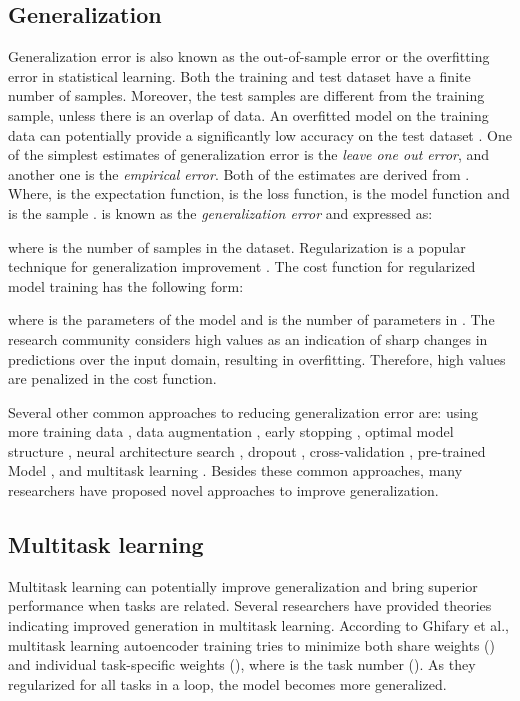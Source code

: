 \documentclass{article}
\begin{document}
\subsection{Generalization}
Generalization error is also known as the out-of-sample error or the overfitting error in statistical learning. Both the training and test dataset have a finite number of samples. Moreover, the test samples are different from the training sample, unless there is an overlap of data. An overfitted model on the training data can potentially provide a significantly low accuracy on the test dataset \cite{bousquet2002stability}. One of the simplest estimates of generalization error is the \emph{leave one out error}, and another one is the \emph{empirical error}. Both of the estimates are derived from . Where,   is the expectation function,  is the loss function,  is the model function and  is the sample \cite{bousquet2002stability}.  is known as the \emph{generalization error} and expressed as:

where  is the number of samples in the dataset. Regularization is a popular technique for generalization improvement \cite{micchelli2005learning}. The cost function for regularized model training has the following form: 

where  is the  parameters of the model  and  is the number of parameters in . The research community considers high  values as an indication of sharp changes in predictions over the input domain, resulting in overfitting. Therefore,  high  values are penalized in the cost function.

Several other common approaches to reducing generalization error are: using more training data \cite{caruana2000overfitting}, data augmentation \cite{cubuk2019autoaugment}, early stopping \cite{caruana2000overfitting}, optimal model structure \cite{hernandez2023training}, neural architecture search \cite{pham2018efficient}, dropout \cite{gal2016dropout}, cross-validation \cite{efron1983estimating, krogh1994neural}, pre-trained Model \cite{kolesnikov2020big}, and multitask learning \cite{ndirango2019generalization}. Besides these common approaches, many researchers have proposed novel approaches to improve generalization. 

\subsection{Multitask learning}
Multitask learning can potentially improve generalization and bring superior performance when tasks are related. Several researchers have provided theories indicating improved generation in multitask learning. According to Ghifary et al., \cite{ghifary2015domain} multitask learning autoencoder training tries to minimize both share weights () and individual task-specific weights (), where  is the task number (). As they regularized  for all tasks in a loop, the model becomes more generalized.
\end{document}
